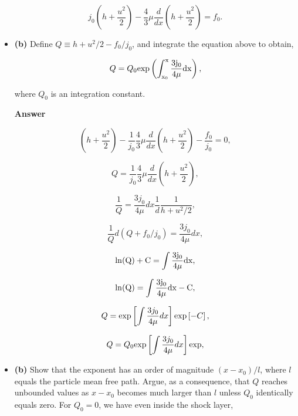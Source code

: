 \documentclass[12pt]{article}
\begin{document}
\begin{itemize}
 \begin{equation}
j_0\left(h + \frac{u^2}{2}\right) - \frac{4}{3}\mu\frac{d}{dx}\left(h+\frac{u^2}{2}\right) = f_0.
\end{equation}
 
\item \textbf{(b)} Define $Q \equiv h + u^2/2 - f_0/j_0$, and integrate the equation above to obtain,

\begin{equation*}
Q = Q_0 \rm{exp}\left( \int_{x_0}^x \frac{3j_0}{4\mu} dx\right),
\end{equation*}  

where $Q_0$ is an integration constant.

\textbf{Answer} 

 \begin{equation}
\left(h + \frac{u^2}{2}\right) - \frac{1}{j_0}\frac{4}{3}\mu\frac{d}{dx}\left(h+\frac{u^2}{2}\right)  - \frac{f_0}{j_0}= 0,
\end{equation}


\begin{equation}
Q = \frac{1}{j_0}\frac{4}{3}\mu\frac{d}{dx}\left(h+\frac{u^2}{2}\right),
\end{equation}


\begin{equation}
\frac{1}{Q} = \frac{3j_0}{4\mu}dx\frac{1}{d}\frac{1}{h+u^2/2},
\end{equation}

\begin{equation}
\frac{1}{Q}d\left(Q + f_0/j_0\right) = \frac{3j_0}{4\mu}dx,
\end{equation}

\begin{equation}
\rm{ln}(Q) + C = \int  \frac{3j_0}{4\mu}dx,
\end{equation}

\begin{equation}
\rm{ln}(Q) = \int  \frac{3j_0}{4\mu}dx - C,
\end{equation}

\begin{equation}
Q = {\rm exp}\left[\int  \frac{3j_0}{4\mu}dx\right]{\rm exp}\left[- C\right],
\end{equation}

\begin{equation}
Q = Q_0{\rm exp}\left[\int  \frac{3j_0}{4\mu}dx\right]{\rm exp},
\end{equation}

\item \textbf{(b)} Show that the exponent has an order of magnitude $(x-x_0)/l$, where $l$ equals the particle mean free path. Argue, as a consequence, that $Q$ reaches unbounded values as $x-x_0$ becomes much larger than $l$ unless $Q_0$ identically equals zero. For $Q_0=0$, we have even inside the shock layer,


\end{itemize}
\end{document}
